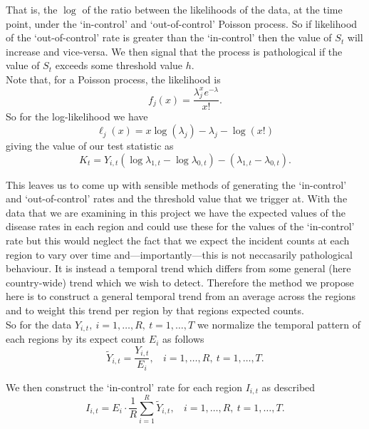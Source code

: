 \documentclass[11pt]{report}
\begin{document}
That is, the $\log$ of the ratio between the likelihoods of the data, at the time point, under the `in-control' and `out-of-control' Poisson process. So if likelihood of the `out-of-control' rate is greater than the `in-control' then the value of $S_t$ will increase and vice-versa. We then signal that the process is pathological if the value of $S_t$ exceeds some threshold value $h$. \\

Note that, for a Poisson process, the likelihood is
\begin{equation}
f_j(x) = \frac{\lambda_j^x e^{-\lambda}}{x!}.
\end{equation}
So for the log-likelihood we have
\begin{equation}
\ell_j(x) = x \log(\lambda_j) - \lambda_j - \log(x!)
\end{equation}
giving the value of our test statistic as
\begin{equation}
K_t = Y_{i,t} (\log{\lambda_{1, t}} - \log{\lambda_{0, t}}) - (\lambda_{1, t} - \lambda_{0, t}).
\end{equation}

This leaves us to come up with sensible methods of generating the `in-control' and `out-of-control' rates and the threshold value that we trigger at. With the data that we are examining in this project we have the expected values of the disease rates in each region and could use these for the values of the `in-control' rate but this would neglect the fact that we expect the incident counts at each region to vary over time and---importantly---this is not neccasarily pathological behaviour. It is instead a temporal trend which differs from some general (here country-wide) trend which we wish to detect. Therefore the method we propose here is to construct a general temporal trend from an average across the regions and to weight this trend per region by that regions expected counts. \\

So for the data $Y_{i,t}, \ i = 1, \ldots, R, \ t = 1, \ldots, T$ we normalize the temporal pattern of each regions by its expect count $E_{i}$ as follows
\begin{equation}
\tilde{Y}_{i, t} = \frac{Y_{i, t}}{E_{i}}, \ \ \ \ i = 1, \ldots, R, \ t = 1, \ldots, T.
\end{equation} 

We then construct the `in-control' rate for each region $I_{i, t}$ as described
\begin{equation}
I_{i, t} = E_i \cdot \frac{1}{R} \sum_{i=1}^R \tilde{Y}_{i, t}, \ \ \ \ i = 1, \ldots, R, \ t = 1, \ldots, T.
\end{equation}
\end{document}
